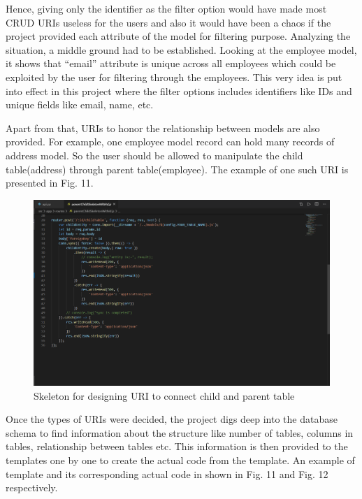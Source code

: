 \documentclass[letterpaper, 10 pt, conference]{ieeeconf}
\begin{document}
Hence, giving only the identifier as the filter option would have made most CRUD URIs useless for the users and also it would have been a chaos if the project provided each attribute of the model for filtering purpose. Analyzing the situation, a middle ground had to be established. Looking at the employee model, it shows that “email” attribute is unique across all employees which could be exploited by the user for filtering through the employees. This very idea is put into effect in this project where the filter options includes identifiers like IDs and unique fields like email, name, etc.

Apart from that, URIs to honor the relationship between models are also provided. For example, one employee model record can hold many records of address model. So the user should be allowed to manipulate the child table(address) through parent table(employee). The example of one such URI is presented in Fig. 11.


\begin{figure}[h]
   \centering
   \includegraphics[scale=0.215]{./fig8.png}
   \caption{Skeleton for designing URI to connect child and parent table}
   \label{fig:my_label}
\end{figure}

Once the types of URIs were decided, the project digs deep into the database schema to find information about the structure like number of tables, columns in tables, relationship between tables etc. This information is then provided to the templates one by one to create the actual code from the template. An example of template and its corresponding actual code in shown in Fig. 11 and Fig. 12 respectively.
\end{document}
